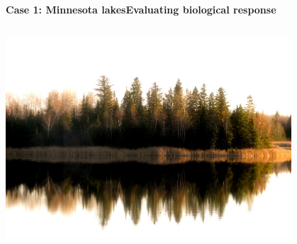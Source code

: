 \documentclass[serif]{beamer}\usepackage[]{graphicx}\usepackage[]{color}
\newcommand{\emtxt}[1]{\textbf{\textit{#1}}}
\begin{document}
\begin{frame}{\textbf{Case 1: Minnesota lakes}}{\textbf{Evaluating biological response}}
\begin{columns}
\begin{column}{0.5\textwidth}
\begin{center}
\includegraphics[width=0.8\textwidth]{fig/mn_lake.jpg}
\end{center}
\end{column}
\end{columns}
\end{frame}

\end{document}
